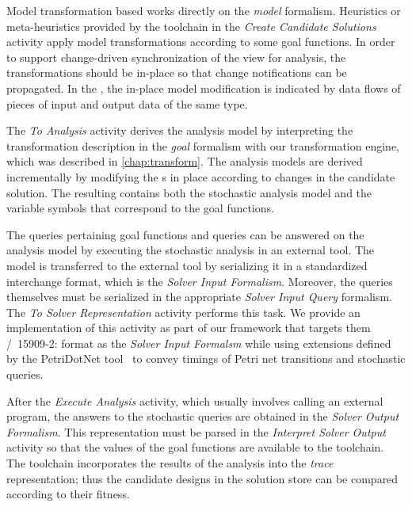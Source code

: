 Model transformation based  works directly on the \emph{model} formalism. Heuristics or meta-heuristics provided by the  toolchain in the \emph{Create Candidate Solutions} activity apply model transformations according to some goal functions. In order to support change-driven synchronization of the  view for analysis, the transformations should be in-place so that change notifications can be propagated. In the , the in-place model modification is indicated by data flows of pieces of input and output data of the same type.

The \emph{To Analysis} activity derives the  analysis model by interpreting the transformation description in the \emph{goal} formalism with our transformation engine, which was described in \cref{chap:transform}. The analysis models are derived incrementally by modifying the s in place according to changes in the candidate solution. The resulting  contains both the stochastic analysis model and the variable symbols that correspond to the goal functions.

The queries pertaining goal functions and queries can be answered on the analysis model by executing the stochastic analysis in an external tool. The  model is transferred to the external tool by serializing it in a standardized interchange format, which is the \emph{Solver Input Formalism}. Moreover, the queries themselves must be serialized in the appropriate \emph{Solver Input Query} formalism. The \emph{To Solver Representation} activity performs this task. We provide an implementation of this activity as part of our framework that targets them /~15909-2:\citeyear{ISO1590922011}  format as the \emph{Solver Input Formalsm} while using extensions defined by the PetriDotNet tool~\citep{Voros17pdn} to convey timings of Petri net transitions and stochastic queries.

After the \emph{Execute Analysis} activity, which usually involves calling an external program, the answers to the stochastic queries are obtained in the \emph{Solver Output Formalism}. This representation must be parsed in the \emph{Interpret Solver Output} activity so that the values of the goal functions are available to the  toolchain. The  toolchain incorporates the results of the analysis into the \emph{trace} representation; thus the candidate designs in the solution store can be compared according to their fitness.

